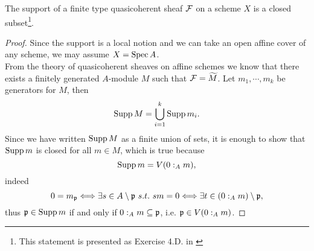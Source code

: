 \begin{lemma}\label{CriterionForClosedSupport}
The support of a finite type quasicoherent sheaf $\mathcal{F}$ on a scheme $X$ is a
closed subset\footnote{This statement is presented as Exercise 4.D. in \cite{VakilClass26}}.
\end{lemma}
\begin{proof}
Since the support is a local notion and we can take an open affine cover of any scheme, we may assume $X=\mathrm{Spec}\, A$.\\
From the theory of quasicoherent sheaves on affine schemes we know that there exists a finitely generated $A$-module $M$ such that $\mathcal{F}=\widetilde{M}$. Let $m_1,\cdots, m_k$ be generators for $M$, then 
\[\mathrm{Supp}\, M=\bigcup_{i=1}^k\mathrm{Supp}\, m_{i}.\]
Since we have written $\mathrm{Supp}\, M$ as a finite union of sets, it is enough to show that $\mathrm{Supp}\, m$ is closed for all $m\in M$, which is true because
\[\mathrm{Supp}\, m=V(0:_Am),\]
indeed
\[0=m_\pf\coimplies \exists s\in A\bs \pf\ s.t.\ sm=0\coimplies \exists t\in (0:_A m)\bs \pf,\]
thus $\mathfrak{p}\in \mathrm{Supp}\, m$ if and only if $0:_A m\subseteq \mathfrak{p}$, i.e. $\mathfrak{p}\in V(0:_Am)$.
\end{proof}



